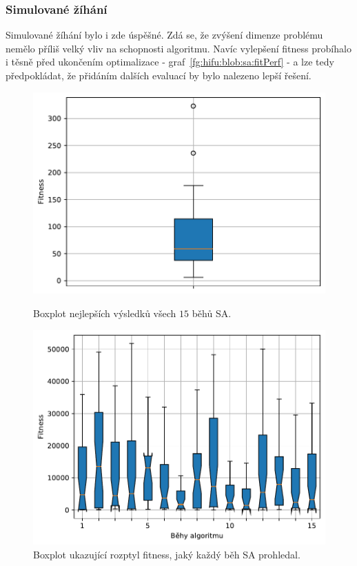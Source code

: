 \subsubsection{Simulované žíhání}
Simulované žíhání bylo i zde úspěšné. Zdá se, že zvýšení dimenze problému nemělo příliš velký vliv na schopnosti algoritmu. Navíc vylepšení fitness probíhalo i těsně před ukončením optimalizace - graf~\ref{fg:hifu:blob:sa:fitPerf} - a lze tedy předpokládat, že přidáním dalších evaluací by bylo nalezeno lepší řešení.

\begin{figure}[H]
\begin{minipage}[t]{0.475\linewidth}
\includegraphics[width=\linewidth]{obrazky-figures/statistics/HIFU/blob/20/SA/bestsBoxplot_WithOutliers.pdf}
\caption{Boxplot nejlepších výsledků všech $15$ běhů SA.}
\label{fg:hifu:blob:sa:best}
\end{minipage}
\hfill
\begin{minipage}[t]{0.475\linewidth}
\includegraphics[width=\linewidth]{obrazky-figures/statistics/HIFU/blob/20/SA/lastGenBoxplots.pdf}
\caption{Boxplot ukazující rozptyl fitness, jaký každý běh SA prohledal.}
\label{fg:hifu:blob:sa:lastGen}
\end{minipage}
\end{figure}

